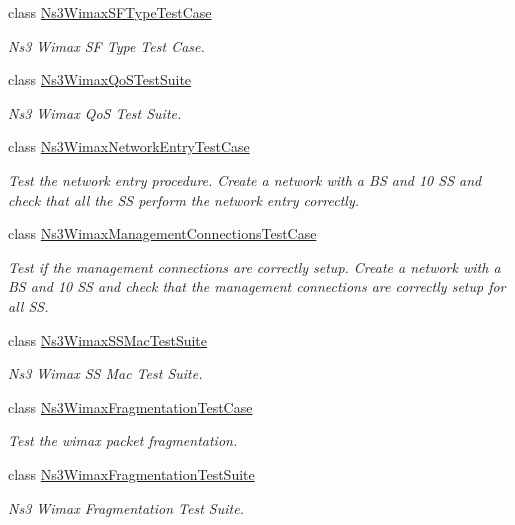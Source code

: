 \begin{DoxyCompactItemize}
class \hyperlink{classNs3WimaxSFTypeTestCase}{Ns3\+Wimax\+S\+F\+Type\+Test\+Case}
\begin{DoxyCompactList}\small\item\em Ns3 Wimax SF Type Test Case. \end{DoxyCompactList}\item 
class \hyperlink{classNs3WimaxQoSTestSuite}{Ns3\+Wimax\+Qo\+S\+Test\+Suite}
\begin{DoxyCompactList}\small\item\em Ns3 Wimax QoS Test Suite. \end{DoxyCompactList}\item 
class \hyperlink{classNs3WimaxNetworkEntryTestCase}{Ns3\+Wimax\+Network\+Entry\+Test\+Case}
\begin{DoxyCompactList}\small\item\em Test the network entry procedure. Create a network with a BS and 10 SS and check that all the SS perform the network entry correctly. \end{DoxyCompactList}\item 
class \hyperlink{classNs3WimaxManagementConnectionsTestCase}{Ns3\+Wimax\+Management\+Connections\+Test\+Case}
\begin{DoxyCompactList}\small\item\em Test if the management connections are correctly setup. Create a network with a BS and 10 SS and check that the management connections are correctly setup for all SS. \end{DoxyCompactList}\item 
class \hyperlink{classNs3WimaxSSMacTestSuite}{Ns3\+Wimax\+S\+S\+Mac\+Test\+Suite}
\begin{DoxyCompactList}\small\item\em Ns3 Wimax SS Mac Test Suite. \end{DoxyCompactList}\item 
class \hyperlink{classNs3WimaxFragmentationTestCase}{Ns3\+Wimax\+Fragmentation\+Test\+Case}
\begin{DoxyCompactList}\small\item\em Test the wimax packet fragmentation. \end{DoxyCompactList}\item 
class \hyperlink{classNs3WimaxFragmentationTestSuite}{Ns3\+Wimax\+Fragmentation\+Test\+Suite}
\begin{DoxyCompactList}\small\item\em Ns3 Wimax Fragmentation Test Suite. \end{DoxyCompactList}\item 

\end{DoxyCompactItemize}

